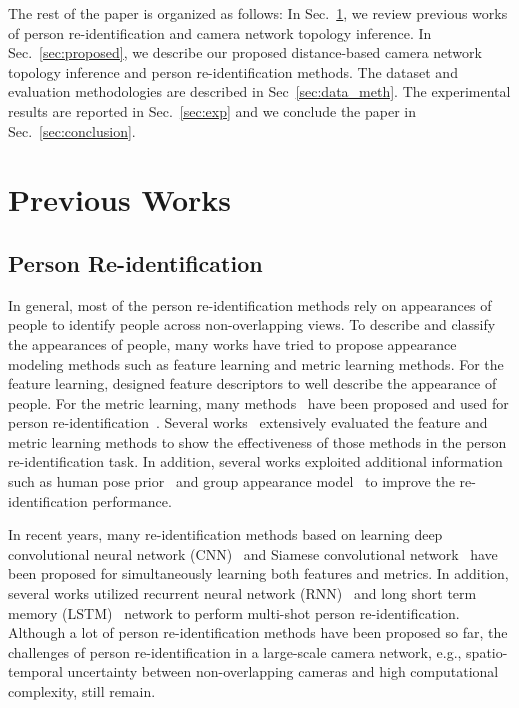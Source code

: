 \documentclass[10pt,twocolumn,letterpaper]{article}
\begin{document}
	The rest of the paper is organized as follows: In Sec.~\ref{sec:preivous}, we review previous works of person re-identification and camera network topology inference. In Sec.~\ref{sec:proposed}, we describe our proposed distance-based camera network topology inference and person re-identification methods. The dataset and evaluation methodologies are described in Sec~\ref{sec:data_meth}. The experimental results are reported in Sec.~\ref{sec:exp} and we conclude the paper in Sec.~\ref{sec:conclusion}.
	
	
	\section{Previous Works}
	\label{sec:preivous}
	
	
	
	\subsection{Person Re-identification}
	In general, most of the person re-identification methods rely on appearances of people to identify people across non-overlapping views.
	To describe and classify the appearances of people, many works have tried to propose appearance modeling methods such as feature learning and metric learning methods.
	For the feature learning, \cite{farenzena2010person, liu2012person,zhao2014learning} designed feature descriptors to well describe the appearance of people.
	For the metric learning, many methods~\cite{koestinger2012large,dikmen2011pedestrian} have been proposed and used for person re-identification~\cite{davis2007information, weinberger2005distance, roth2014mahalanobis}. Several works~\cite{koestinger2012large,roth2014mahalanobis} extensively evaluated the feature and metric learning methods to show the effectiveness of those methods in the person re-identification task.
	In addition, several works exploited additional information such as human pose prior~\cite{wu2015viewpoint, cho2016improving, Su_2017_ICCV} and group appearance model~\cite{Zheng2009associating, Lisanti_2017_ICCV} to improve the re-identification performance.
	
	In recent years, many re-identification methods based on learning deep convolutional neural network (CNN)~\cite{zheng2016mars, su2016deep, xiao2016learning} and Siamese convolutional network~\cite{ahmed2015improved, yi2014deep, wang2016joint, Chung_2017_ICCV} have been proposed for simultaneously learning both features and metrics.
	In addition, several works utilized recurrent neural network (RNN)~\cite{mclaughlin2016recurrent, Zhou_2017_CVPR_P2S, Zhou_2017_CVPR_forest} and long short term memory (LSTM)~\cite{yan2016person} network to perform multi-shot person re-identification.
	Although a lot of person re-identification methods have been proposed so far, the challenges of person re-identification in a large-scale camera network, e.g., spatio-temporal uncertainty between non-overlapping cameras and high computational complexity, still remain.
	
\end{document}
